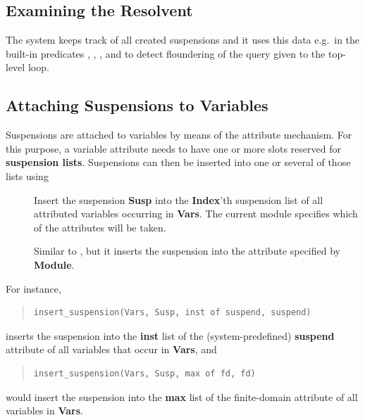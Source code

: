 \subsection{Examining the Resolvent}
The system keeps track of all created suspensions and it
uses this data e.g.\ in the built-in predicates
,
,
,
and to detect floundering of the query given to the {\eclipse} top-level loop.



\subsection{Attaching Suspensions to Variables}


Suspensions are attached to variables by means of the attribute mechanism.
For this purpose, a variable attribute needs to have one or more slots
reserved for {\bf suspension lists}.
Suspensions can then be inserted into one or several of those lists using
\begin{description}
\item[]
Insert the suspension {\bf Susp} into the {\bf Index}'th
suspension list of all attributed variables occurring in {\bf Vars}.
The current module specifies which of the attributes will be taken.

\item[]
Similar to ,
but it inserts the suspension into the attribute specified by {\bf Module}.
\end{description}

For instance,
\begin{quote}\begin{verbatim}
insert_suspension(Vars, Susp, inst of suspend, suspend)
\end{verbatim}\end{quote}
inserts the suspension into the {\bf inst}%
list of the (system-predefined) {\bf suspend}
attribute of all variables that occur in {\bf Vars}, and
\begin{quote}\begin{verbatim}
insert_suspension(Vars, Susp, max of fd, fd)
\end{verbatim}\end{quote}
would insert the suspension into the {\bf max} list of the finite-domain
attribute of all variables in {\bf Vars}.


